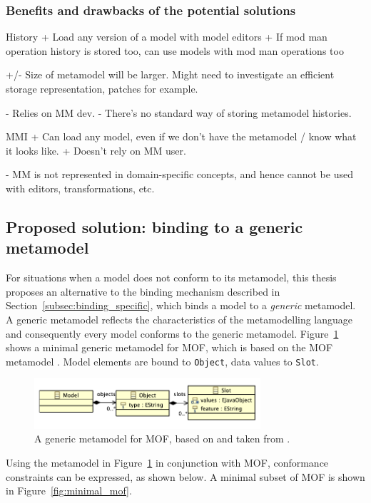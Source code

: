 \subsubsection{Benefits and drawbacks of the potential solutions}
History
+ Load any version of a model with model editors
+ If mod man operation history is stored too, can use models with mod man operations too

+/- Size of metamodel will be larger. Might need to investigate an efficient storage representation, patches for example.

- Relies on MM dev.
- There's no standard way of storing metamodel histories.


MMI
+ Can load any model, even if we don't have the metamodel / know what it looks like.
+ Doesn't rely on MM user.

- MM is not represented in domain-specific concepts, and hence cannot be used with editors, transformations, etc.


\subsection{Proposed solution: binding to a generic metamodel}
\label{subsec:binding}
For situations when a model does not conform to its metamodel, this thesis proposes an alternative to the binding mechanism described in Section~\ref{subsec:binding_specific}, which binds a model to a \emph{generic} metamodel. A generic metamodel reflects the characteristics of the metamodelling language and consequently every model conforms to the generic metamodel. Figure~\ref{fig:slot_model} shows a minimal generic metamodel for MOF, which is based on the MOF metamodel \cite{mof}. Model elements are bound to \texttt{Object}, data values to \texttt{Slot}.

\begin{figure}[htbp]
  \centering
  \includegraphics[width=3.3in]{5.Implementation/slot_model.pdf}
  \caption[A generic metamodel for MOF]{A generic metamodel for MOF, based on \cite{mof} and taken from \cite{rose09enhanced}.}
  \label{fig:slot_model}
\end{figure}

Using the metamodel in Figure~\ref{fig:slot_model} in conjunction with MOF, conformance constraints can be expressed, as shown below. A minimal subset of MOF is shown in Figure~\ref{fig:minimal_mof}.

